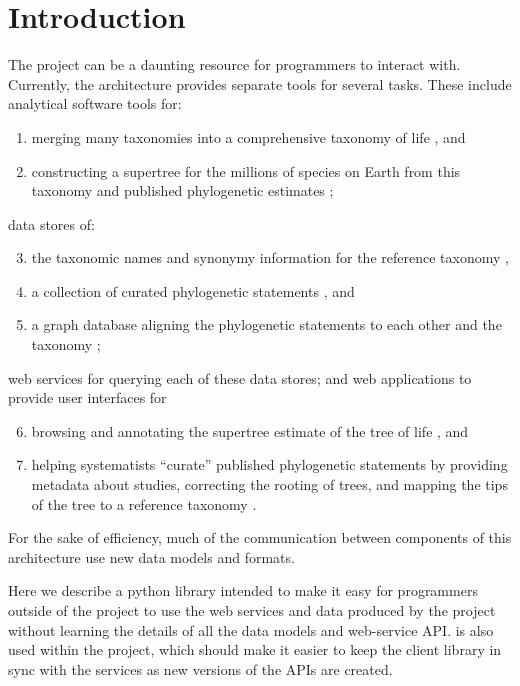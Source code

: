\section{Introduction}
The \otol project can be a daunting resource for programmers to interact with.
Currently, the architecture provides separate tools for several tasks.
These include analytical software tools for:
\begin{enumerate}
    \item merging many taxonomies into a comprehensive taxonomy of life \citep{smasher}, and
    \item constructing a supertree for the millions of species on Earth from this 
        taxonomy and published phylogenetic estimates \citep{SmithHB2013};
\end{enumerate}
data stores of:
\begin{enumerate}
   \setcounter{enumi}{2}
    \item the taxonomic names and synonymy information for the reference taxonomy \citep{OTT,taxomachine},
    \item a collection of curated phylogenetic statements \citep{phylesystem}, and
    \item a graph database aligning the phylogenetic statements to each other and the taxonomy \citep{treemachine,SmithHB2013};
\end{enumerate}
web services for querying each of these data stores; and web applications to provide
user interfaces for
\begin{enumerate}
   \setcounter{enumi}{5}
    \item browsing and annotating the supertree estimate of the tree of life \citep{otolbrowser}, and
    \item helping systematists ``curate'' published phylogenetic statements by providing
        metadata about studies, correcting the rooting of trees, and mapping the tips
        of the tree to a reference taxonomy \citep{otolcurator}.
\end{enumerate}
For the sake of efficiency, much of the communication between components of this architecture
use new data models and formats.

Here we describe a python library intended to make it easy for programmers outside
    of the \otol project to use the web services and data produced by the project without
    learning the details of all the data models and web-service API.
\pey is also used within the project, which should make it easier to keep the client library
     in sync with the services as new versions of the \otol APIs are created.


